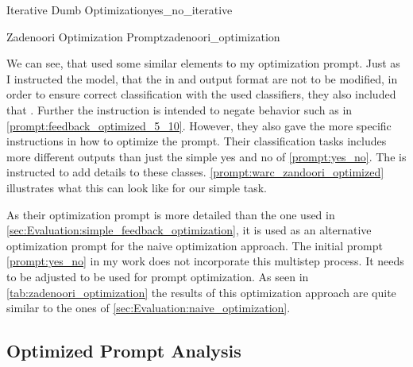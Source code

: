 \begin{prompt}{\KISS Iterative Dumb Optimization}{yes_no_iterative}
\begin{prompt}{Zadenoori Optimization Prompt}{zadenoori_optimization}
    \\
    
\end{prompt}

We can see, that \citeauthor{zadenoori2025AutomaticPrompt} used some similar elements to my optimization prompt.
Just as I instructed the model, that the in and output format are not to be modified, in order to ensure correct classification with the used classifiers, they also included that .
Further the instruction  is intended to negate behavior such as in \autoref{prompt:feedback_optimized_5_10}.
However, they also gave the \LLM more specific instructions in how to optimize the prompt.
Their classification tasks includes more different outputs than just the simple yes and no of \autoref{prompt:yes_no}.
The \LLM is instructed to add details to these classes.
\autoref{prompt:warc_zandoori_optimized} illustrates what this can look like for our simple \TLR \RtR task.

As their optimization prompt is more detailed than the one used in \autoref{sec:Evaluation:simple_feedback_optimization}, it is used as an alternative optimization prompt for the naive optimization approach.
The initial prompt \autoref{prompt:yes_no} in my work does not incorporate this multistep process.
It needs to be adjusted to be used for \RtR prompt optimization.
As seen in \autoref{tab:zadenoori_optimization} the results of this optimization approach are quite similar to the ones of \autoref{sec:Evaluation:naive_optimization}.

\subsection{Optimized Prompt Analysis}
\label{subsec:Evaluation:varying-the-optimization-prompt:optimized-prompt-analysis}


\end{prompt}
